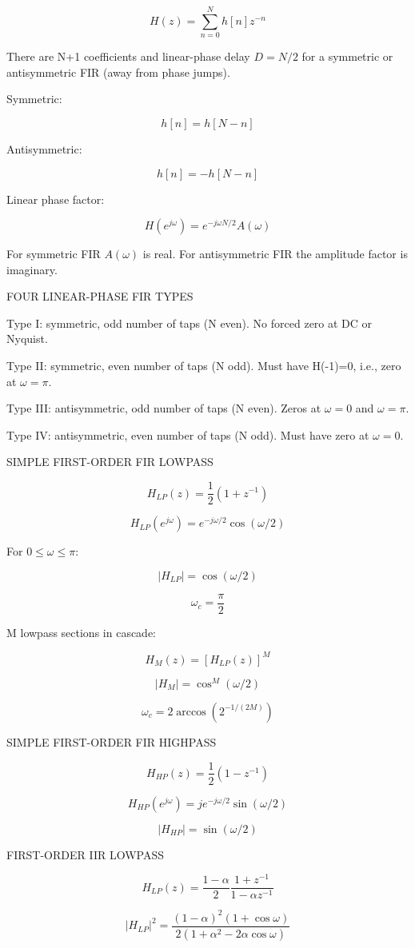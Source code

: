 $$H(z)=\sum_{n=0}^{N}h[n]z^{-n}$$

There are N+1 coefficients and linear-phase delay $D=N/2$ for a symmetric or antisymmetric FIR (away from phase jumps).

Symmetric:

$$h[n]=h[N-n]$$

Antisymmetric:

$$h[n]=-h[N-n]$$

Linear phase factor:

$$H(e^{j\omega})=e^{-j\omega N/2}A(\omega)$$

For symmetric FIR $A(\omega)$ is real. For antisymmetric FIR the amplitude factor is imaginary.

FOUR LINEAR-PHASE FIR TYPES

Type I: symmetric, odd number of taps (N even). No forced zero at DC or Nyquist.

Type II: symmetric, even number of taps (N odd). Must have H(-1)=0, i.e., zero at $\omega=\pi$.

Type III: antisymmetric, odd number of taps (N even). Zeros at $\omega=0$ and $\omega=\pi$.

Type IV: antisymmetric, even number of taps (N odd). Must have zero at $\omega=0$.

SIMPLE FIRST-ORDER FIR LOWPASS

$$H_{LP}(z)=\frac12(1+z^{-1})$$

$$H_{LP}(e^{j\omega})=e^{-j\omega/2}\cos(\omega/2)$$

For $0\le\omega\le\pi$:

$$|H_{LP}|=\cos(\omega/2)$$

$$\omega_c=\frac{\pi}{2}$$

M lowpass sections in cascade:

$$H_M(z)=[H_{LP}(z)]^M$$

$$|H_M|=\cos^M(\omega/2)$$

$$\omega_c=2\arccos(2^{-1/(2M)})$$

SIMPLE FIRST-ORDER FIR HIGHPASS

$$H_{HP}(z)=\frac12(1-z^{-1})$$

$$H_{HP}(e^{j\omega})=je^{-j\omega/2}\sin(\omega/2)$$

$$|H_{HP}|=\sin(\omega/2)$$

FIRST-ORDER IIR LOWPASS

$$H_{LP}(z)=\frac{1-\alpha}{2}\frac{1+z^{-1}}{1-\alpha z^{-1}}$$

$$|H_{LP}|^2=\frac{(1-\alpha)^2(1+\cos\omega)}{2(1+\alpha^2-2\alpha\cos\omega)}$$

